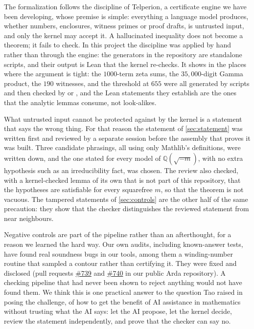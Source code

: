 \documentclass[11pt]{article}
\theoremstyle{definition}
\newcommand{\Q}{\mathbb{Q}}
\begin{document}
The formalization follows the discipline of Telperion, a certificate engine we have been developing, whose premise is simple: everything a language model produces, whether numbers, enclosures, witness primes or proof drafts, is untrusted input, and only the kernel may accept it. A hallucinated inequality does not become a theorem; it fails to check. In this project the discipline was applied by hand rather than through the engine: the generators in the repository are standalone scripts, and their output is Lean that the kernel re-checks. It shows in the places where the argument is tight: the $1000$-term zeta sums, the $35{,}000$-digit Gamma product, the $190$ witnesses, and the threshold at $655$ were all generated by scripts and then checked by  or , and the Lean statements they establish are the ones that the analytic lemmas consume, not look-alikes.

What untrusted input cannot be protected against by the kernel is a statement that says the wrong thing. For that reason the statement of \cref{sec:statement} was written first and reviewed by a separate session before the assembly that proves it was built. Three candidate phrasings, all using only Mathlib's definitions, were written down, and the one stated for every model of $\Q(\sqrt{-m})$, with no extra hypothesis such as an irreducibility fact, was chosen. The review also checked, with a kernel-checked lemma of its own that is not part of this repository, that the hypotheses are satisfiable for every squarefree $m$, so that the theorem is not vacuous. The tampered statements of \cref{sec:controls} are the other half of the same precaution: they show that the checker distinguishes the reviewed statement from near neighbours.

Negative controls are part of the pipeline rather than an afterthought, for a reason we learned the hard way. Our own audits, including known-answer tests, have found real soundness bugs in our tools, among them a winding-number routine that sampled a contour rather than certifying it. They were fixed and disclosed (pull requests \href{https://github.com/DrMurphyIsIn/Arda/pull/739}{\#739} and \href{https://github.com/DrMurphyIsIn/Arda/pull/740}{\#740} in our public Arda repository). A checking pipeline that had never been shown to reject anything would not have found them. We think this is one practical answer to the question Tao raised in posing the challenge, of how to get the benefit of AI assistance in mathematics without trusting what the AI says: let the AI propose, let the kernel decide, review the statement independently, and prove that the checker can say no.
\end{document}
